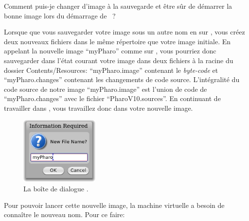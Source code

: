 \documentclass[a4paper,10pt,twoside]{book}
\begin{document}
\begin{faq} %
Comment puis-je changer d'image à la sauvegarde et être sûr de démarrer la bonne image lors du démarrage de \mbox{\pharo~?}
\end{faq}
\answer
Lorsque que vous sauvegarder votre image sous un autre nom en \clickant sur , vous créez deux nouveaux fichiers dans le même répertoire que votre image initiale. En appelant la nouvelle image ``myPharo'' comme sur , vous pourriez donc sauvegarder dans l'état courant votre image dans deux fichiers à la racine du dossier \mbox{\textsf{Contents/Resources}:} ``myPharo.image'' contenant le \emph{byte-code} et ``myPharo.changes'' contenant les changements de code source. L'intégralité du code source de notre image ``myPharo.image'' est l'union de code de ``myPharo.changes'' avec le fichier ``PharoV10.sources''.
En continuant de travailler dans \pharo{}, vous travaillez donc dans votre nouvelle image.
\begin{figure}[htb]
	{\centerline{\includegraphics[width=0.35\textwidth]{saveAsOneClick}}}
 	\caption{La boîte de dialogue .}
\end{figure}
Pour pouvoir lancer cette nouvelle image, la machine virtuelle a besoin de connaître le nouveau nom. Pour ce faire:
\end{document}

